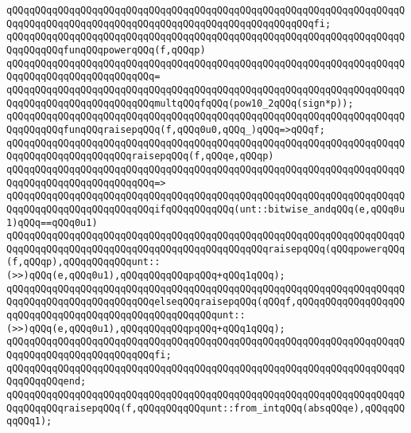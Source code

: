 \verb|qQQqqQQqqQQqqQQqqQQqqQQqqQQqqQQqqQQqqQQqqQQqqQQqqQQqqQQqqQQqqQQqqQQqqQQqqQQqqQQqqQQqqQQqqQQqqQQqqQQqqQQqqQQqqQQqqQQqqQQqqQQqfi;|\newline
\newline
\verb|qQQqqQQqqQQqqQQqqQQqqQQqqQQqqQQqqQQqqQQqqQQqqQQqqQQqqQQqqQQqqQQqqQQqqQQqqQQqqQQqfunqQQqpowerqQQq(f,qQQqp)|\newline
\verb|qQQqqQQqqQQqqQQqqQQqqQQqqQQqqQQqqQQqqQQqqQQqqQQqqQQqqQQqqQQqqQQqqQQqqQQqqQQqqQQqqQQqqQQqqQQqqQQq=|\newline
\verb|qQQqqQQqqQQqqQQqqQQqqQQqqQQqqQQqqQQqqQQqqQQqqQQqqQQqqQQqqQQqqQQqqQQqqQQqqQQqqQQqqQQqqQQqqQQqqQQqmultqQQqfqQQq(pow10_2qQQq(sign*p));|\newline
\newline
\verb|qQQqqQQqqQQqqQQqqQQqqQQqqQQqqQQqqQQqqQQqqQQqqQQqqQQqqQQqqQQqqQQqqQQqqQQqqQQqqQQqfunqQQqraisepqQQq(f,qQQq0u0,qQQq_)qQQq=>qQQqf;|\newline
\verb|qQQqqQQqqQQqqQQqqQQqqQQqqQQqqQQqqQQqqQQqqQQqqQQqqQQqqQQqqQQqqQQqqQQqqQQqqQQqqQQqqQQqqQQqqQQqraisepqQQq(f,qQQqe,qQQqp)|\newline
\verb|qQQqqQQqqQQqqQQqqQQqqQQqqQQqqQQqqQQqqQQqqQQqqQQqqQQqqQQqqQQqqQQqqQQqqQQqqQQqqQQqqQQqqQQqqQQqqQQq=>|\newline
\verb|qQQqqQQqqQQqqQQqqQQqqQQqqQQqqQQqqQQqqQQqqQQqqQQqqQQqqQQqqQQqqQQqqQQqqQQqqQQqqQQqqQQqqQQqqQQqqQQqifqQQqqQQqqQQq(unt::bitwise_andqQQq(e,qQQq0u1)qQQq==qQQq0u1)|\newline
\newline
\verb|qQQqqQQqqQQqqQQqqQQqqQQqqQQqqQQqqQQqqQQqqQQqqQQqqQQqqQQqqQQqqQQqqQQqqQQqqQQqqQQqqQQqqQQqqQQqqQQqqQQqqQQqqQQqqQQqqQQqraisepqQQq(qQQqpowerqQQq(f,qQQqp),qQQqqQQqqQQqunt::(>>)qQQq(e,qQQq0u1),qQQqqQQqqQQqpqQQq+qQQq1qQQq);|\newline
\verb|qQQqqQQqqQQqqQQqqQQqqQQqqQQqqQQqqQQqqQQqqQQqqQQqqQQqqQQqqQQqqQQqqQQqqQQqqQQqqQQqqQQqqQQqqQQqqQQqelseqQQqraisepqQQq(qQQqf,qQQqqQQqqQQqqQQqqQQqqQQqqQQqqQQqqQQqqQQqqQQqqQQqqQQqqQQqunt::(>>)qQQq(e,qQQq0u1),qQQqqQQqqQQqpqQQq+qQQq1qQQq);|\newline
\verb|qQQqqQQqqQQqqQQqqQQqqQQqqQQqqQQqqQQqqQQqqQQqqQQqqQQqqQQqqQQqqQQqqQQqqQQqqQQqqQQqqQQqqQQqqQQqqQQqfi;|\newline
\verb|qQQqqQQqqQQqqQQqqQQqqQQqqQQqqQQqqQQqqQQqqQQqqQQqqQQqqQQqqQQqqQQqqQQqqQQqqQQqqQQqend;|\newline
\newline
\newline
\verb|qQQqqQQqqQQqqQQqqQQqqQQqqQQqqQQqqQQqqQQqqQQqqQQqqQQqqQQqqQQqqQQqqQQqqQQqqQQqqQQqraisepqQQq(f,qQQqqQQqqQQqunt::from_intqQQq(absqQQqe),qQQqqQQqqQQq1);|\newline
